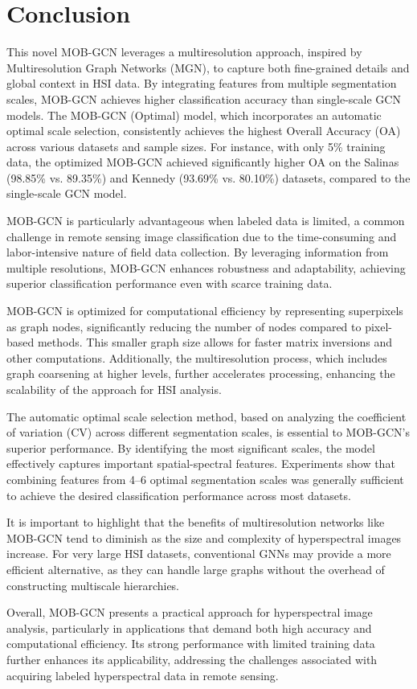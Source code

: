 \section{Conclusion} \label{sec:conclusion}

This novel MOB-GCN leverages a multiresolution approach, inspired by Multiresolution Graph Networks (MGN), to capture both fine-grained details and global context in HSI data. By integrating features from multiple segmentation scales, MOB-GCN achieves higher classification accuracy than single-scale GCN models. The MOB-GCN (Optimal) model, which incorporates an automatic optimal scale selection, consistently achieves the highest Overall Accuracy (OA) across various datasets and sample sizes. For instance, with only 5\% training data, the optimized MOB-GCN achieved significantly higher OA on the Salinas (98.85\% vs. 89.35\%) and Kennedy (93.69\% vs. 80.10\%) datasets, compared to the single-scale GCN model.

MOB-GCN is particularly advantageous when labeled data is limited, a common challenge in remote sensing image classification due to the time-consuming and labor-intensive nature of field data collection. By leveraging information from multiple resolutions, MOB-GCN enhances robustness and adaptability, achieving superior classification performance even with scarce training data.

MOB-GCN is optimized for computational efficiency by representing superpixels as graph nodes, significantly reducing the number of nodes compared to pixel-based methods. This smaller graph size allows for faster matrix inversions and other computations. Additionally, the multiresolution process, which includes graph coarsening at higher levels, further accelerates processing, enhancing the scalability of the approach for HSI analysis.

The automatic optimal scale selection method, based on analyzing the coefficient of variation (CV) across different segmentation scales, is essential to MOB-GCN's superior performance. By identifying the most significant scales, the model effectively captures important spatial-spectral features. Experiments show that combining features from 4–6 optimal segmentation scales was generally sufficient to achieve the desired classification performance across most datasets.

It is important to highlight that the benefits of multiresolution networks like MOB-GCN tend to diminish as the size and complexity of hyperspectral images increase. For very large HSI datasets, conventional GNNs may provide a more efficient alternative, as they can handle large graphs without the overhead of constructing multiscale hierarchies.  

Overall, MOB-GCN presents a practical approach for hyperspectral image analysis, particularly in applications that demand both high accuracy and computational efficiency. Its strong performance with limited training data further enhances its applicability, addressing the challenges associated with acquiring labeled hyperspectral data in remote sensing.
